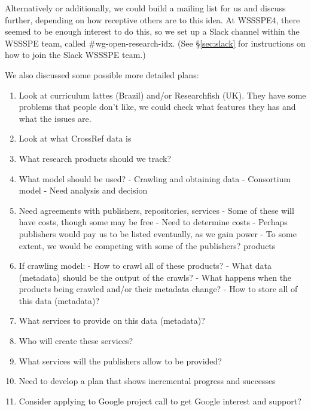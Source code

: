 Alternatively or additionally, we could build a mailing list for us and discuss further, depending on how receptive others are to this idea.  At WSSSPE4, there seemed to be enough interest to do this, so we set up a Slack channel within the WSSSPE team, called \#wg-open-research-idx.  (See \S\ref{sec:slack} for instructions on how to join the Slack WSSSPE team.)

We also discussed some possible more detailed plans:

\begin{enumerate}
\item Look at curriculum lattes (Brazil) and/or Researchfish (UK).  They have some problems that people don't like, we could check what features they has and what the issues are.

\item Look at what CrossRef data is

\item What research products should we track?

\item What model should be used?
- Crawling and obtaining data
- Consortium model
- Need analysis and decision

\item Need agreements with publishers, repositories, services
- Some of these will have costs, though some may be free
- Need to determine costs
- Perhaps publishers would pay us to be listed eventually, as we gain power
- To some extent, we would be competing with some of the publishers? products

\item If crawling model:
- How to crawl all of these products?
- What data (metadata) should be the output of the crawls?
    - What happens when the products being crawled and/or their metadata change?
- How to store all of this data (metadata)?

\item What services to provide on this data (metadata)?

\item Who will create these services?

\item What services will the publishers allow to be provided?

\item Need to develop a plan that shows incremental progress and successes

\item Consider applying to Google project call to get Google interest and support?
\end{enumerate}


